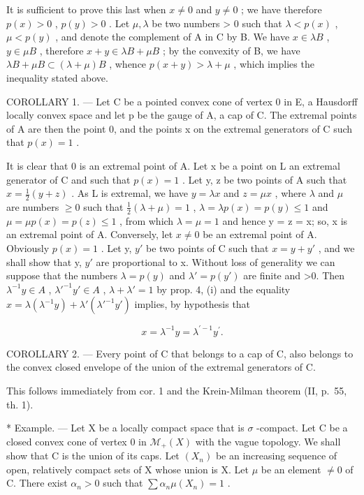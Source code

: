 It is sufficient to prove this last when \(x \neq 0\) and \(y \neq 0\) ; we have therefore \(p(x) > 0\) , \(p(y) > 0\) . Let \(\mu, \lambda\) be two numbers \textgreater{} 0 such that \(\lambda < p(x)\) , \(\mu < p(y)\) , and denote the complement of A in C by B. We have \(x \in \lambda B\) , \(y \in \mu B\) , therefore \(x + y \in \lambda B + \mu B\) ; by the convexity of B, we have \(\lambda B + \mu B \subset (\lambda + \mu)B\) , whence \(p(x + y) > \lambda + \mu\) , which implies the inequality stated above.

COROLLARY 1. --- Let C be a pointed convex cone of vertex 0 in E, a Hausdorff locally convex space and let p be the gauge of A, a cap of C. The extremal points of A are then the point 0, and the points x on the extremal generators of C such that \(p(x) = 1\) .

It is clear that 0 is an extremal point of A. Let x be a point on L an extremal generator of C and such that \(p(x) = 1\) . Let y, z be two points of A such that \(x = \frac{1}{2}(y + z)\) . As L is extremal, we have \(y = \lambda x\) and \(z = \mu x\) , where \(\lambda\) and \(\mu\) are numbers \(\geqslant 0\) such that \(\frac{1}{2}(\lambda + \mu) = 1\) , \(\lambda = \lambda p(x) = p(y) \leqslant 1\) and \(\mu = \mu p(x) = p(z) \leqslant 1\) , from which \(\lambda = \mu = 1\) and hence y = z = x; so, x is an extremal point of A. Conversely, let \(x \neq 0\) be an extremal point of A. Obviously \(p(x) = 1\) . Let y, \(y'\) be two points of C such that \(x = y + y'\) , and we shall show that y, \(y'\) are proportional to x. Without loss of generality we can suppose that the numbers \(\lambda = p(y)\) and \(\lambda' = p(y')\) are finite and \textgreater0. Then \(\lambda^{-1}y \in A\) , \(\lambda'^{-1}y' \in A\) , \(\lambda + \lambda' = 1\) by prop. 4, (i) and the equality \(x = \lambda(\lambda^{-1}y) + \lambda'(\lambda'^{-1}y')\) implies, by hypothesis that

\[
x = \lambda^ {- 1} y = \lambda^ {\prime - 1} y ^ {\prime}.
\]

COROLLARY 2. --- Every point of C that belongs to a cap of C, also belongs to the convex closed envelope of the union of the extremal generators of C.

This follows immediately from cor. 1 and the Krein-Milman theorem (II, p.~55, th. 1).

* Example. --- Let X be a locally compact space that is \(\sigma\) -compact. Let C be a closed convex cone of vertex 0 in \(\mathcal{M}_{+}(X)\) with the vague topology. We shall show that C is the union of its caps. Let \((X_{n})\) be an increasing sequence of open, relatively compact sets of X whose union is X. Let \(\mu\) be an element \(\neq 0\) of C. There exist \(\alpha_{n} > 0\) such that \(\sum \alpha_{n}\mu(X_{n}) = 1\) .

